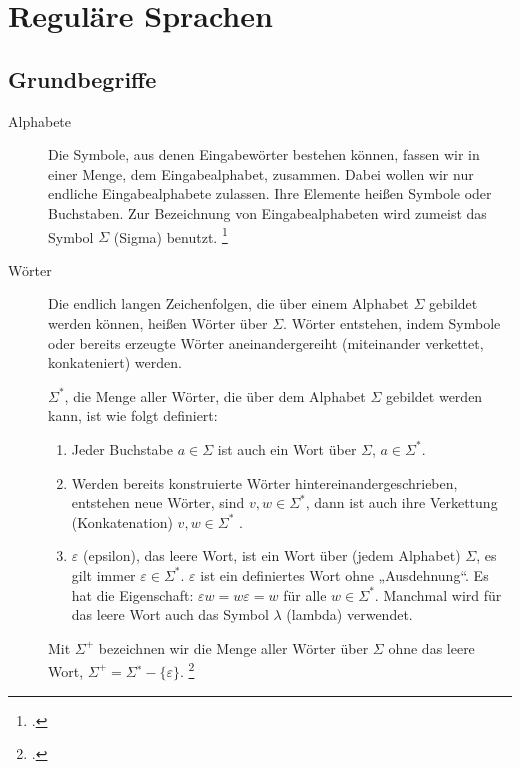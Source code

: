 \documentclass{lehramt-informatik-haupt}
\begin{document}

\chapter{Reguläre Sprachen}

%

\section{Grundbegriffe}

\begin{description}
\item[Alphabete]

Die Symbole, aus denen Eingabewörter bestehen können, fassen wir in
einer Menge, dem Eingabealphabet, zusammen. Dabei wollen wir nur
endliche Eingabealphabete zulassen. Ihre Elemente heißen Symbole oder
Buchstaben. Zur Bezeichnung von Eingabealphabeten wird zumeist das
Symbol $\Sigma$ (Sigma) benutzt.
\footcite[Seite 15]{vossen}

\item[Wörter]
Die endlich langen Zeichenfolgen, die über einem Alphabet $\Sigma$
gebildet werden können, heißen Wörter über $\Sigma$. Wörter entstehen,
indem Symbole oder bereits erzeugte Wörter aneinandergereiht
(miteinander verkettet, konkateniert) werden.

$\Sigma^*$, die Menge aller Wörter, die über dem Alphabet $\Sigma$
gebildet werden kann, ist wie folgt definiert:

\begin{enumerate}
\item Jeder Buchstabe $a \in \Sigma$ ist auch ein Wort über $\Sigma$,
\dh $a \in \Sigma^*$.

\item Werden bereits konstruierte Wörter hintereinandergeschrieben,
entstehen neue Wörter, \dh sind $v, w \in \Sigma^*$, dann ist auch ihre
Verkettung (Konkatenation) $v, w \in \Sigma^*$ .

\item $\varepsilon$ (epsilon), das leere Wort, ist ein Wort über (jedem
Alphabet) $\Sigma$, \dh es gilt immer $\varepsilon \in \Sigma^*$.
$\varepsilon$ ist ein definiertes Wort ohne „Ausdehnung“. Es hat die
Eigenschaft: $\varepsilon w = w \varepsilon = w$ für alle $w \in
\Sigma^*$. Manchmal wird für das leere Wort auch das Symbol $\lambda$
(lambda) verwendet.
\end{enumerate}

Mit $\Sigma^+$ bezeichnen wir die Menge aller Wörter über $\Sigma$ ohne
das leere Wort, \dh $\Sigma^+ = \Sigma^∗ - \{ \varepsilon \}$.
\footcite[Seite 16]{vossen}
\end{description}
\end{document}
